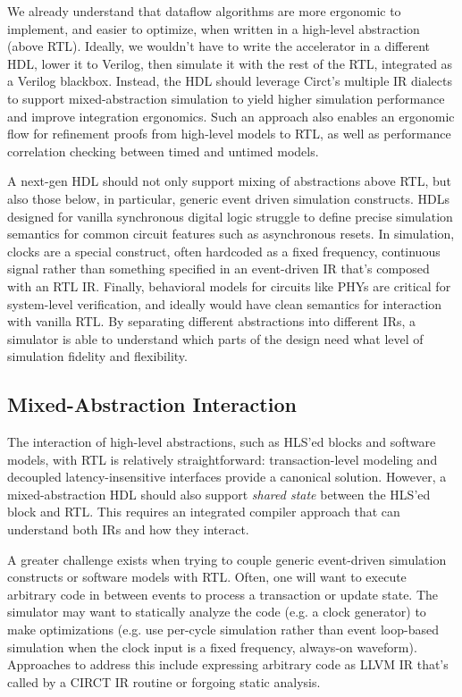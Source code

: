 \documentclass[sigplan,review,nonacm]{acmart}
\begin{document}
We already understand that dataflow algorithms are more ergonomic to implement, and easier to optimize, when written in a high-level abstraction (above RTL).
Ideally, we wouldn't have to write the accelerator in a different HDL, lower it to Verilog, then simulate it with the rest of the RTL, integrated as a Verilog blackbox.
Instead, the HDL should leverage Circt's multiple IR dialects to support mixed-abstraction simulation to yield higher simulation performance and improve integration ergonomics\cite{pymtl3}.
Such an approach also enables an ergonomic flow for refinement proofs from high-level models to RTL, as well as performance correlation checking between timed and untimed models.


A next-gen HDL should not only support mixing of abstractions above RTL, but also those below, in particular, generic event driven simulation constructs.
HDLs designed for vanilla synchronous digital logic struggle to define precise simulation semantics for common circuit features such as asynchronous resets.
In simulation, clocks are a special construct, often hardcoded as a fixed frequency, continuous signal rather than something specified in an event-driven IR that's composed with an RTL IR.
Finally, behavioral models for circuits\cite{llhd} like PHYs are critical for system-level verification, and ideally would have clean semantics for interaction with vanilla RTL.
By separating different abstractions into different IRs, a simulator is able to understand which parts of the design need what level of simulation fidelity and flexibility.

\subsection{Mixed-Abstraction Interaction}

The interaction of high-level abstractions, such as HLS'ed blocks and software models, with RTL is relatively straightforward: transaction-level modeling and decoupled latency-insensitive interfaces provide a canonical solution\cite{umoc}.
However, a mixed-abstraction HDL should also support \textit{shared state} between the HLS'ed block and RTL.
This requires an integrated compiler approach that can understand both IRs and how they interact.

A greater challenge exists when trying to couple generic event-driven simulation constructs or software models with RTL.
Often, one will want to execute arbitrary code in between events to process a transaction or update state.
The simulator may want to statically analyze the code (e.g. a clock generator) to make optimizations (e.g. use per-cycle simulation rather than event loop-based simulation when the clock input is a fixed frequency, always-on waveform).
Approaches to address this include expressing arbitrary code as LLVM IR that's called by a CIRCT IR routine or forgoing static analysis.
\end{document}
